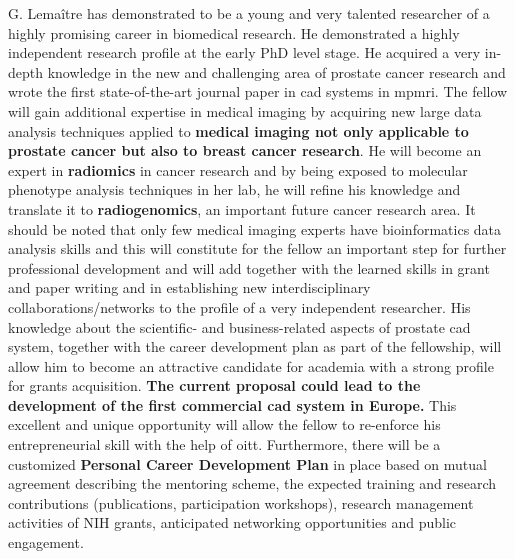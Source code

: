 G. Lema\^itre has demonstrated to be a young and very talented researcher of a highly promising career in biomedical research.
He demonstrated a highly independent research profile at the early PhD level stage. 
He acquired a very in-depth knowledge in the new and challenging area of prostate cancer research and wrote the first state-of-the-art journal paper in \ac{cad} systems in \ac{mpmri}.
The fellow will gain additional expertise in medical imaging by acquiring new large data analysis techniques applied to \textbf{medical imaging not only applicable to prostate cancer but also to breast cancer research}.
He will become an expert in \textbf{radiomics} in cancer research and by being exposed to molecular phenotype analysis techniques in her lab, he will refine his knowledge and translate it to \textbf{radiogenomics}, an important future cancer research area.
It should be noted that only few medical imaging experts have bioinformatics data analysis skills and this will constitute for the fellow an important step for further professional development and will add together with the learned skills in grant and paper writing and in establishing new interdisciplinary collaborations/networks to the profile of a very independent researcher.
His knowledge about the scientific- and business-related aspects of prostate \ac{cad} system, together with the career development plan as part of the fellowship, will allow him to become an attractive candidate for academia with a strong profile for grants acquisition.
\textbf{The current proposal could lead to the development of the first commercial \ac{cad} system in Europe.}
This excellent and unique opportunity will allow the fellow to re-enforce his entrepreneurial skill with the help of \ac{oitt}.
Furthermore, there will be a customized \textbf{Personal Career Development Plan} in place based on mutual agreement describing the mentoring scheme, the expected training and research contributions (publications, participation workshops), research management activities of NIH grants, anticipated networking opportunities and public engagement.